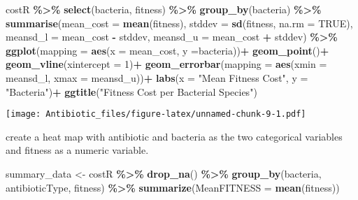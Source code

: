 \documentclass[
]{article}
\newenvironment{Shaded}{\begin{snugshade}}{\end{snugshade}}
\newcommand{\AttributeTok}[1]{\textcolor[rgb]{0.13,0.29,0.53}{#1}}
\newcommand{\ConstantTok}[1]{\textcolor[rgb]{0.56,0.35,0.01}{#1}}
\newcommand{\DecValTok}[1]{\textcolor[rgb]{0.00,0.00,0.81}{#1}}
\newcommand{\FunctionTok}[1]{\textcolor[rgb]{0.13,0.29,0.53}{\textbf{#1}}}
\newcommand{\NormalTok}[1]{#1}
\newcommand{\OtherTok}[1]{\textcolor[rgb]{0.56,0.35,0.01}{#1}}
\newcommand{\SpecialCharTok}[1]{\textcolor[rgb]{0.81,0.36,0.00}{\textbf{#1}}}
\newcommand{\StringTok}[1]{\textcolor[rgb]{0.31,0.60,0.02}{#1}}
\begin{document}
\begin{Shaded}
\begin{Highlighting}[]
\NormalTok{costR }\SpecialCharTok{\%\textgreater{}\%} 
  \FunctionTok{select}\NormalTok{(bacteria, fitness) }\SpecialCharTok{\%\textgreater{}\%} 
  \FunctionTok{group\_by}\NormalTok{(bacteria) }\SpecialCharTok{\%\textgreater{}\%} 
  \FunctionTok{summarise}\NormalTok{(}\AttributeTok{mean\_cost =} \FunctionTok{mean}\NormalTok{(fitness),}
            \AttributeTok{stddev =} \FunctionTok{sd}\NormalTok{(fitness, }\AttributeTok{na.rm =} \ConstantTok{TRUE}\NormalTok{),}
            \AttributeTok{meansd\_l =}\NormalTok{ mean\_cost }\SpecialCharTok{{-}}\NormalTok{ stddev,}
            \AttributeTok{meansd\_u =}\NormalTok{ mean\_cost }\SpecialCharTok{+}\NormalTok{ stddev) }\SpecialCharTok{\%\textgreater{}\%} 
  \FunctionTok{ggplot}\NormalTok{(}\AttributeTok{mapping =} \FunctionTok{aes}\NormalTok{(}\AttributeTok{x =}\NormalTok{ mean\_cost, }\AttributeTok{y =}\NormalTok{bacteria))}\SpecialCharTok{+}
  \FunctionTok{geom\_point}\NormalTok{()}\SpecialCharTok{+}
  \FunctionTok{geom\_vline}\NormalTok{(}\AttributeTok{xintercept =} \DecValTok{1}\NormalTok{)}\SpecialCharTok{+}
  \FunctionTok{geom\_errorbar}\NormalTok{(}\AttributeTok{mapping =} \FunctionTok{aes}\NormalTok{(}\AttributeTok{xmin =}\NormalTok{ meansd\_l, }\AttributeTok{xmax =}\NormalTok{ meansd\_u))}\SpecialCharTok{+}
  \FunctionTok{labs}\NormalTok{(}\AttributeTok{x =} \StringTok{"Mean Fitness Cost"}\NormalTok{, }\AttributeTok{y =} \StringTok{"Bacteria"}\NormalTok{)}\SpecialCharTok{+}
  \FunctionTok{ggtitle}\NormalTok{(}\StringTok{"Fitness Cost per Bacterial Species"}\NormalTok{)}
\end{Highlighting}
\end{Shaded}

\texttt{[image: Antibiotic\_files/figure-latex/unnamed-chunk-9-1.pdf]}

create a heat map with antibiotic and bacteria as the two categorical
variables and fitness as a numeric variable.

\begin{Shaded}
\begin{Highlighting}[]
\NormalTok{summary\_data }\OtherTok{\textless{}{-}}\NormalTok{ costR }\SpecialCharTok{\%\textgreater{}\%}
  \FunctionTok{drop\_na}\NormalTok{() }\SpecialCharTok{\%\textgreater{}\%} 
  \FunctionTok{group\_by}\NormalTok{(bacteria, antibioticType, fitness) }\SpecialCharTok{\%\textgreater{}\%}
  \FunctionTok{summarize}\NormalTok{(}\AttributeTok{MeanFITNESS =} \FunctionTok{mean}\NormalTok{(fitness))}
\end{Highlighting}
\end{Shaded}
\end{document}

